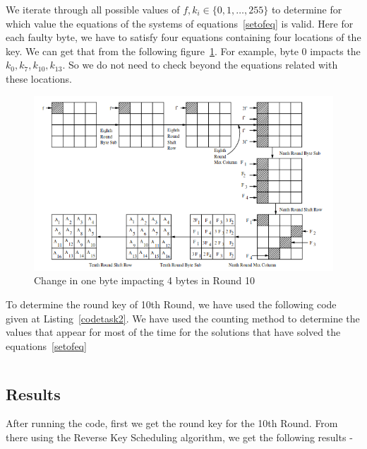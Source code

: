 \documentclass{article}
\begin{document}
We iterate through all possible values of $f, k_i \in \{0,1,\dots,255\}$ to determine for which value the equations of the systems of equations~\ref{setofeq} is valid. Here for each faulty byte, we have to satisfy four equations containing four locations of the key. We can get that from the following figure~\ref{fig:task2}. For example, byte 0 impacts the $k_0, k_7, k_{10}, k_{13}$. So we do not need to check beyond the equations related with these locations. 

\begin{figure}[H]
	\centering
	\includegraphics[width=\linewidth]{task2}
	\caption{Change in one byte impacting 4 bytes in Round 10}
	\label{fig:task2}
\end{figure}

To determine the round key of 10th Round, we have used the following code given at Listing~\ref{codetask2}. We have used the counting method to determine the values that appear for most of the time for the solutions that have solved the equations~\ref{setofeq}

\begin{listing}[H]
\inputminted[linenos,tabsize=2,breaklines]{python}{task2.py}\label{codetask2}
\end{listing}


\subsection{Results}
After running the code, first we get the round key for the 10th Round. From there using the Reverse Key Scheduling algorithm, we get the following results - 
\end{document}
